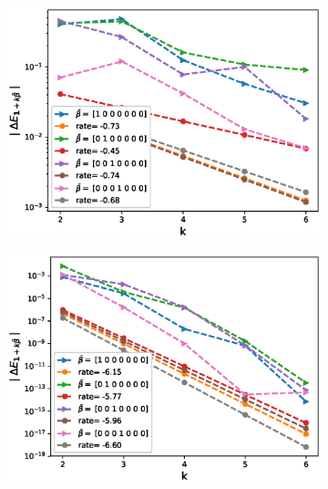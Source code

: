 \documentclass[11pt]{article}
\begin{document}
\FloatBarrier
\begin{figure}[htb]
	\centering %
	\begin{subfigure}{0.33\textwidth}
		\includegraphics[width=\linewidth]{./figures/Heston_single_call_full_truncation_vol/mixed_rates/set4/N_4/first_difference_heston_4steps_hierarchical}
		\caption{}
		\label{fig:1}
	\end{subfigure}\hfil %
	\begin{subfigure}{0.33\textwidth}
		\includegraphics[width=\linewidth]{./figures/Heston_single_call_ABR_moment_matching/mixed_rates/set4/N_4/first_difference_heston_4steps_hierarchical}
		\caption{}
		\label{fig:2}
	\end{subfigure}\hfil %
	\begin{subfigure}{0.33\textwidth}

\end{subfigure}
\end{figure}
\end{document}
